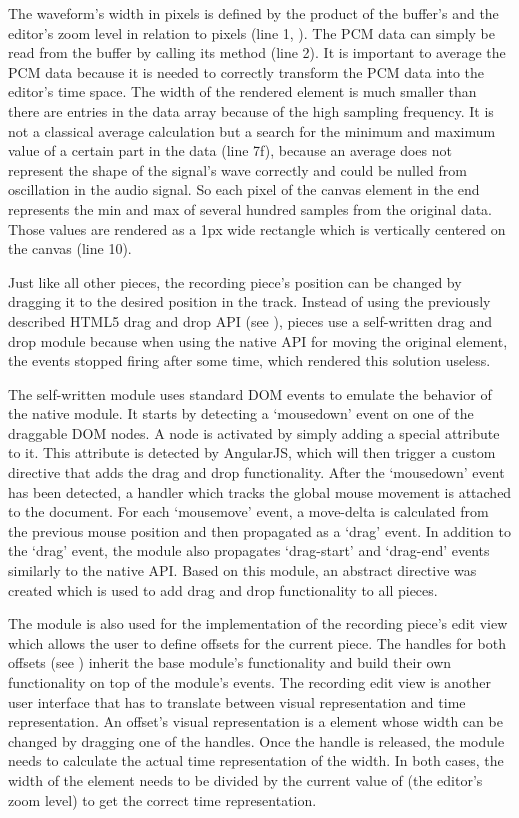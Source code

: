 The waveform's width in pixels is defined by the product of the buffer's  and the editor's zoom level in relation to pixels (line 1, ). The PCM data can simply be read from the buffer by calling its  method (line 2). It is important to average the PCM data because it is needed to correctly transform the PCM data into the editor's time space. The width of the rendered element is much smaller than there are entries in the data array because of the high sampling frequency. It is not a classical average calculation but a search for the minimum and maximum value of a certain part in the data (line 7f), because an average does not represent the shape of the signal's wave correctly and could be nulled from oscillation in the audio signal. So each pixel of the canvas element in the end represents the min and max of several hundred samples from the original data. Those values are rendered as a 1px wide rectangle which is vertically centered on the canvas (line 10).

Just like all other pieces, the recording piece's position can be changed by dragging it to the desired position in the track. Instead of using the previously described HTML5 drag and drop API (see ), pieces use a self-written drag and drop module because when using the native API for moving the original element, the events stopped firing after some time, which rendered this solution useless.

The self-written module uses standard DOM events to emulate the behavior of the native module. It starts by detecting a `mousedown' event on one of the draggable DOM nodes. A node is activated by simply adding a special attribute to it. This attribute is detected by AngularJS, which will then trigger a custom directive that adds the drag and drop functionality. After the `mousedown' event has been detected, a handler which tracks the global mouse movement is attached to the document. For each `mousemove' event, a move-delta is calculated from the previous mouse position and then propagated as a `drag' event. In addition to the `drag' event, the module also propagates `drag-start' and `drag-end' events similarly to the native API. Based on this module, an abstract  directive was created which is used to add drag and drop functionality to all pieces.

The module is also used for the implementation of the recording piece's edit view which allows the user to define offsets for the current piece. The handles for both offsets (see ) inherit the base module's functionality and build their own functionality on top of the module's events. The recording edit view is another user interface that has to translate between visual representation and time representation. An offset's visual representation is a  element whose width can be changed by dragging one of the handles. Once the handle is released, the module needs to calculate the actual time representation of the  width. In both cases, the width of the element needs to be divided by the current value of  (the editor's zoom level) to get the correct time representation.

